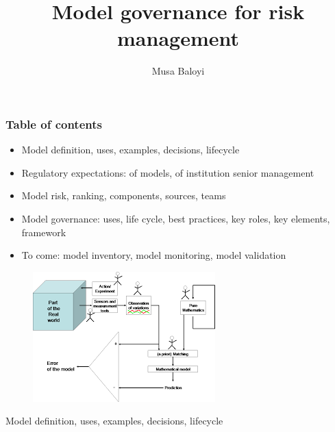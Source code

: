 \documentclass[11pt]{beamer}
\begin{document}
	\author{Musa Baloyi}
	\title{Model governance for risk management}
	\begin{frame}[plain]
	\maketitle
\end{frame}


\begin{frame}
\frametitle{Table of contents}
\begin{itemize}
	\item Model definition, uses, examples, decisions, lifecycle
	\item Regulatory expectations: of models, of institution senior management
	\item Model risk, ranking, components, sources, teams%
	\item Model governance: uses, life cycle, best practices, key roles, key elements, framework
	\item To come: model inventory, model monitoring, model validation
\end{itemize}
\end{frame}

\begin{frame}
\begin{figure}[h]
	\centering
	\includegraphics[scale=.7]{images/model}
\end{figure}
\centering
Model definition, uses, examples, decisions, lifecycle
\end{frame}
\end{document}
